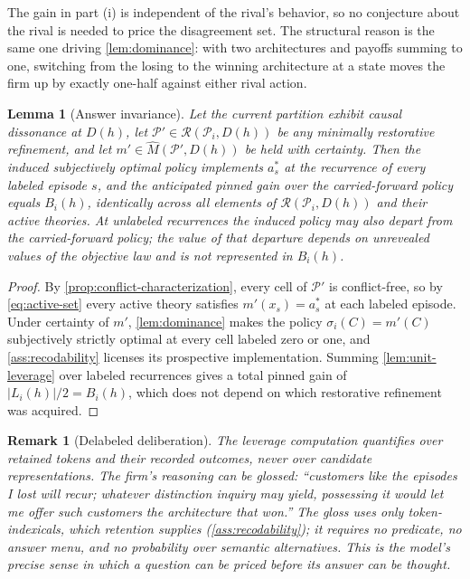 \documentclass[11pt]{article}
\newtheorem{lemma}[assumption]{Lemma}
\newtheorem{remark}[assumption]{Remark}
\begin{document}
The gain in part (i) is independent of the rival's behavior, so no conjecture
about the rival is needed to price the disagreement set.  The structural
reason is the same one driving \cref{lem:dominance}: with two architectures
and payoffs summing to one, switching from the losing to the winning
architecture at a state moves the firm up by exactly one-half against either
rival action.

\begin{lemma}[Answer invariance]
\label{lem:answer-invariance}
Let the current partition exhibit causal dissonance at $D(h)$, let
$\mathcal P'\in\mathcal R(\mathcal P_i,D(h))$ be any minimally restorative
refinement, and let $m'\in\widehat M(\mathcal P',D(h))$ be held with
certainty.  Then the induced subjectively optimal policy implements $a^*_s$ at
the recurrence of every labeled episode $s$, and the anticipated pinned gain
over the carried-forward policy equals $B_i(h)$, identically across all
elements of $\mathcal R(\mathcal P_i,D(h))$ and their active theories.  At
unlabeled recurrences the induced policy may also depart from the
carried-forward policy; the value of that departure depends on unrevealed
values of the objective law and is not represented in $B_i(h)$.
\end{lemma}

\begin{proof}
By \cref{prop:conflict-characterization}, every cell of $\mathcal P'$ is
conflict-free, so by \cref{eq:active-set} every active theory satisfies
$m'(x_s)=a^*_s$ at each labeled episode.  Under certainty of $m'$,
\cref{lem:dominance} makes the policy $\sigma_i(C)=m'(C)$ subjectively
strictly optimal at every cell labeled zero or one, and
\cref{ass:recodability} licenses its prospective implementation.  Summing
\cref{lem:unit-leverage} over labeled recurrences gives a total pinned gain of
$\lvert L_i(h)\rvert/2=B_i(h)$, which does not depend on which restorative
refinement was acquired.
\end{proof}

\begin{remark}[Delabeled deliberation]
\label{rem:delabeled-deliberation}
The leverage computation quantifies over retained tokens and their recorded
outcomes, never over candidate representations.  The firm's reasoning can be
glossed: ``customers like the episodes I lost will recur; whatever distinction
inquiry may yield, possessing it would let me offer such customers the
architecture that won.''  The gloss uses only token-indexicals, which
retention supplies (\cref{ass:recodability}); it requires no predicate, no
answer menu, and no probability over semantic alternatives.  This is the
model's precise sense in which a question can be priced before its answer can
be thought.
\end{remark}
\end{document}
